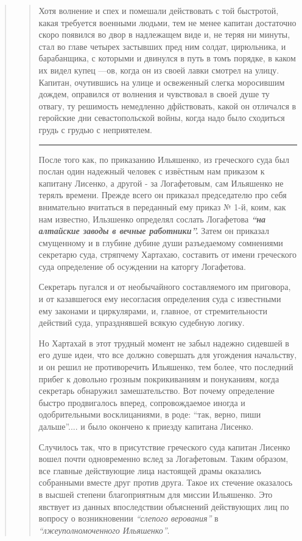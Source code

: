 \begin{quote}
\begin{quote}
Хотя волнение и спех и помешали действовать с той
быстротой, какая требуется военными людьми, тем не менее
капитан достаточно скоро появился во двор в надлежащем виде и, не теряя ни
минуты, стал во главе четырех застывших пред ним солдат, цирюльника, и
барабанщика, с которыми и двинулся в путь в томъ порядке, в каком их видел
купец —ов, когда он из своей лавки смотрел на улицу. Капитан, очутившись на
улице и освеженный слегка моросившим дождем, оправился от волнения и чувствовал
в своей душе ту отвагу, ту решимость немедленно дфйствовать, какой он отличался
в геройские дни севастопольской войны, когда надо было сходиться грудь с грудью
с неприятелем.

\par\noindent\rule{\textwidth}{0.4pt}

После того как, по приказанию Ильяшенко, из греческого суда 
был послан один надежный человек с
извёстным нам приказом к капитану Лисенко, а другой - за Логафетовым, 
сам Ильяшенко не терялъ времени. Прежде всего он приказал председателю про себя
внимательно вчитаться в переданный ему приказ № 1-й,
коим, как нам известно, Ильзшенко определял сослать
Логафетова \textbf{\em ``на алтайские заводы в вечные работники''.} 
Затем он приказал смущенному и в глубине дубине души 
разъедаемому сомнениями секретарю суда, стряпчему Хартахаю,
составить от имени греческого суда определение об осуждении на каторгу Логафетова.

Секретарь пугался и от необычайного составляемого
им приговора, и от казавшегося ему несогласия определения суда с известными
ему законами и циркулярами, и, главное, от стремительности действий суда, упразднявшей всякую судебную
логику.

Но Хартахай в этот трудный момент не забыл
надежно сидевшей в его душе идеи, что все должно совершать для угождения начальству,
и он решил не противоречить Ильяшенко, тем более, что последний прибег
к довольно грозным покрикиваниям и понуканиям, когда
секретарь обнаружил замешательство. Вот почему определение быстро продвигалось вперед,
сопровождаемое иногда и одобрительными восклицаниями, в роде: ``так, верно,
пиши дальше''.... и было окончено к приезду капитана Лисенко.

Случилось так, что в присутствие греческого суда капитан Лисенко вошел почти
одновременно вслед за Логафетовым. Таким образом, все главные действующие лица
настоящей драмы оказались собранными вместе друг против друга. Такое их
стечение оказалось в высшей степени благоприятным для миссии Ильяшенко.
Это явствует из данных впоследствии объяснений действующих лиц по вопросу о возникновении \emph{``слепого верования''}
в \emph{``лжеуполномоченного Ильяшенко''}.


\end{quote}
\end{quote}
